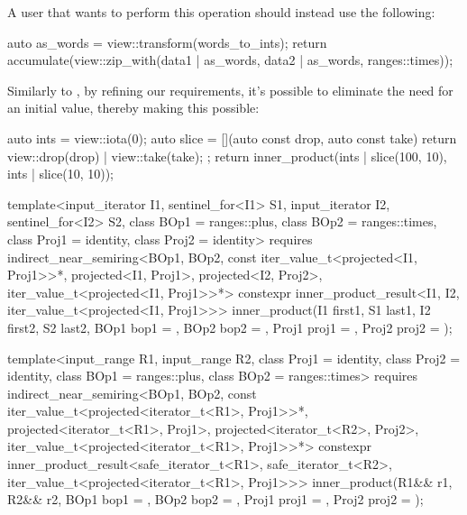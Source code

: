 A user that wants to perform this operation should instead use the following:
\begin{codeblock}
auto as_words = view::transform(words_to_ints);
return accumulate(view::zip_with(data1 | as_words, data2 | as_words, ranges::times{}));
\end{codeblock}

Similarly to , by refining our requirements, it's possible to eliminate the need
for an initial value, thereby making this possible:

\begin{codeblock}
auto ints = view::iota(0);
auto slice = [](auto const drop, auto const take) {
   return view::drop(drop) | view::take(take);
};
return inner_product(ints | slice(100, 10), ints | slice(10, 10));
\end{codeblock}

\begin{codeblock}
template<input_iterator I1, sentinel_for<I1> S1, input_iterator I2, sentinel_for<I2> S2,
         class BOp1 = ranges::plus, class BOp2 = ranges::times,
         class Proj1 = identity, class Proj2 = identity>
requires indirect_near_semiring<BOp1, BOp2,
                                const iter_value_t<projected<I1, Proj1>>*,
                                projected<I1, Proj1>,
                                projected<I2, Proj2>,
                                iter_value_t<projected<I1, Proj1>>*>
constexpr inner_product_result<I1, I2, iter_value_t<projected<I1, Proj1>>>
inner_product(I1 first1, S1 last1, I2 first2, S2 last2, BOp1 bop1 = {}, BOp2 bop2 = {},
              Proj1 proj1 = {}, Proj2 proj2 = {});

template<input_range R1, input_range R2, class Proj1 = identity, class Proj2 = identity,
         class BOp1 = ranges::plus, class BOp2 = ranges::times>
requires indirect_near_semiring<BOp1, BOp2,
                                const iter_value_t<projected<iterator_t<R1>, Proj1>>*,
                                projected<iterator_t<R1>, Proj1>,
                                projected<iterator_t<R2>, Proj2>,
                                iter_value_t<projected<iterator_t<R1>, Proj1>>*>
constexpr inner_product_result<safe_iterator_t<R1>, safe_iterator_t<R2>,
                               iter_value_t<projected<iterator_t<R1>, Proj1>>>
inner_product(R1&& r1, R2&& r2, BOp1 bop1 = {}, BOp2 bop2 = {},
              Proj1 proj1 = {}, Proj2 proj2 = {});
\end{codeblock}

